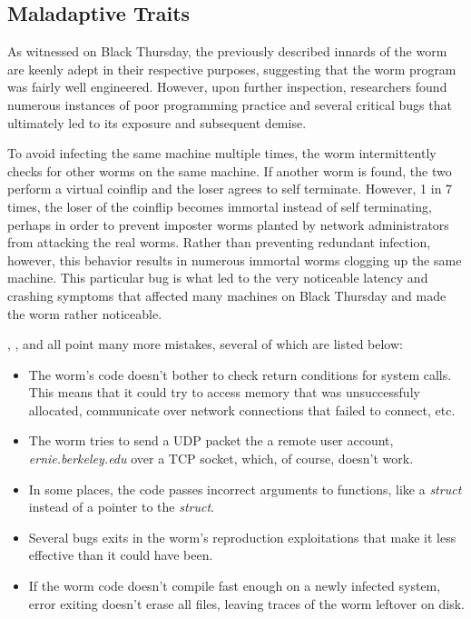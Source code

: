 \subsection*{Maladaptive Traits}
As witnessed on Black Thursday, the previously described innards of the worm are
keenly adept in their respective purposes, suggesting that the worm program was
fairly well engineered. However, upon further inspection, researchers found
numerous instances of poor programming practice and several critical
bugs that ultimately led to its exposure and subsequent demise.

To avoid infecting the same machine multiple times, the worm 
intermittently checks for other worms on the same machine. If another worm is
found, the two perform a virtual coinflip and the loser agrees to self
terminate.
However, 1 in 7 times, the loser of the coinflip becomes immortal instead of
self terminating, perhaps in order to prevent imposter worms planted by network
administrators from attacking the real worms\cite{spafford_internet_1989}.
Rather than preventing redundant infection, however, this behavior results in
numerous immortal worms clogging up the same machine. This particular bug is
what led to the very noticeable latency and crashing symptoms that affected many
machines on Black Thursday and made the worm rather noticeable.

\cite{spafford_internet_1989}, \cite{seeley_tour_1989}, and \cite{eichin_microscope_1989}
all point many more mistakes, several of which are listed below: 
\begin{itemize}
\item The worm's code doesn't bother to check return conditions for system
calls. This means that it could try to access memory that was
unsuccessfuly allocated, communicate over network connections that failed to
connect, etc. 
\item The worm tries to send a UDP packet the a remote user account,
\textit{ernie.berkeley.edu} over a TCP socket, which, of course, doesn't work.
\item In some places, the code passes incorrect arguments to functions, like a
\textit{struct} instead of a pointer to the \textit{struct}.
\item Several bugs exits in the worm's reproduction exploitations that make it
less effective than it could have been. 
\item If the worm code doesn't compile fast enough on a newly infected system,
error exiting doesn't erase all files, leaving traces of the worm leftover on
disk.
\end{itemize}

